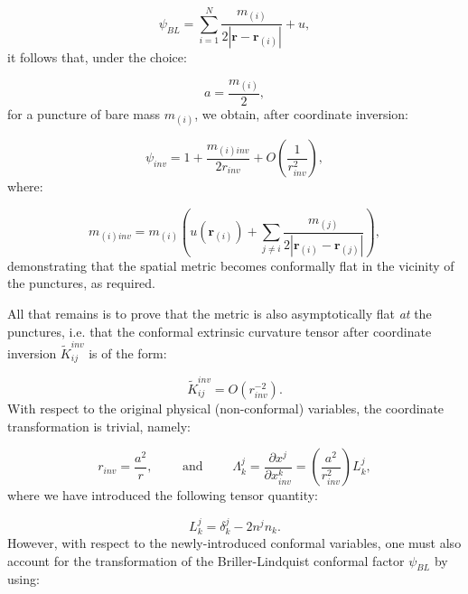 \documentclass{article}
\begin{document}
\begin{equation}
\psi_{BL} = \sum_{i = 1}^{N} \frac{m_{\left( i \right)}}{2 \left\lvert \mathbf{r} - \mathbf{r}_{\left( i \right)} \right\rvert} + u,
\end{equation}
it follows that, under the choice:

\begin{equation}
a = \frac{m_{\left( i \right)}}{2},
\end{equation}
for a puncture of bare mass ${m_{\left( i \right)}}$, we obtain, after coordinate inversion:

\begin{equation}
\psi_{inv} = 1 + \frac{m_{\left( i \right) inv}}{2 r_{inv}} + O \left( \frac{1}{r_{inv}^{2}} \right),
\end{equation}
where:

\begin{equation}
m_{\left( i \right) inv} = m_{\left( i \right)} \left( u \left( \mathbf{r}_{\left( i \right)} \right) + \sum_{j \neq i} \frac{m_{\left( j \right)}}{2 \left\lvert \mathbf{r}_{\left( i \right)} - \mathbf{r}_{\left( j \right)} \right\rvert} \right),
\end{equation}
demonstrating that the spatial metric becomes conformally flat in the vicinity of the punctures, as required.

All that remains is to prove that the metric is also asymptotically flat \textit{at} the punctures, i.e. that the conformal extrinsic curvature tensor after coordinate inversion ${\tilde{K}_{i j}^{inv}}$ is of the form:

\begin{equation}
\tilde{K}_{i j}^{inv} = O \left( r_{inv}^{-2} \right).
\end{equation}
With respect to the original physical (non-conformal) variables, the coordinate transformation is trivial, namely:

\begin{equation}
r_{inv} = \frac{a^2}{r}, \qquad \text{ and } \qquad \Lambda_{k}^{j} = \frac{\partial x^j}{\partial x_{inv}^{k}} = \left( \frac{a^2}{r_{inv}^{2}} \right) L_{k}^{j},
\end{equation}
where we have introduced the following tensor quantity:

\begin{equation}
L_{k}^{j} = \delta_{k}^{j} - 2 n^j n_k.
\end{equation}
However, with respect to the newly-introduced conformal variables, one must also account for the transformation of the Briller-Lindquist conformal factor ${\psi_{BL}}$ by using:
\end{document}
